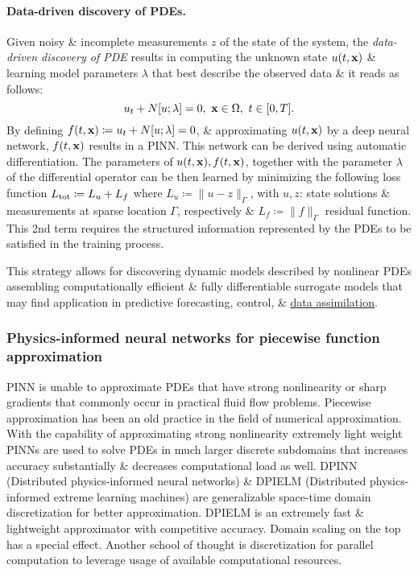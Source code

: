 \documentclass{article}
\begin{document}
\paragraph{Data-driven discovery of PDEs.} Given noisy \& incomplete measurements $z$ of the state of the system, the {\it data-driven discovery of PDE} results in computing the unknown state $u(t,{\bf x})$ \& learning model parameters $\lambda$ that best describe the observed data \& it reads as follows:
\begin{equation}
	u_t + N[u;\lambda] = 0,\ {\bf x}\in\Omega,\ t\in[0,T].
\end{equation}
By defining $f(t,{\bf x})\coloneqq u_t + N[u;\lambda] = 0$, \& approximating $u(t,{\bf x})$ by a deep neural network, $f(t,{\bf x})$ results in a PINN. This network can be derived using automatic differentiation. The parameters of $u(t,{\bf x}),f(t,{\bf x})$, together with the parameter $\lambda$ of the differential operator can be then learned by minimizing the following loss function $L_{\rm tot}\coloneqq L_u + L_f$ where $L_u\coloneqq\|u - z\|_\Gamma$, with $u,z$: state solutions \& measurements at sparse location $\Gamma$, respectively \& $L_f\coloneqq\|f\|_\Gamma$ residual function. This 2nd term requires the structured information represented by the PDEs to be satisfied in the training process.

This strategy allows for discovering dynamic models described by nonlinear PDEs assembling computationally efficient \& fully differentiable surrogate models that may find application in predictive forecasting, control, \& \href{https://en.wikipedia.org/wiki/Data_assimilation}{data assimilation}.

\subsubsection{Physics-informed neural networks for piecewise function approximation}
PINN is unable to approximate PDEs that have strong nonlinearity or sharp gradients that commonly occur in practical fluid flow problems. Piecewise approximation has been an old practice in the field of numerical approximation. With the capability of approximating strong nonlinearity extremely light weight PINNs are used to solve PDEs in much larger discrete subdomains that increases accuracy substantially \& decreases computational load as well. DPINN (Distributed physics-informed neural networks) \& DPIELM (Distributed physics-informed extreme learning machines) are generalizable space-time domain discretization for better approximation. DPIELM is an extremely fast \& lightweight approximator with competitive accuracy. Domain scaling on the top has a special effect. Another school of thought is discretization for parallel computation to leverage usage of available computational resources.
\end{document}
